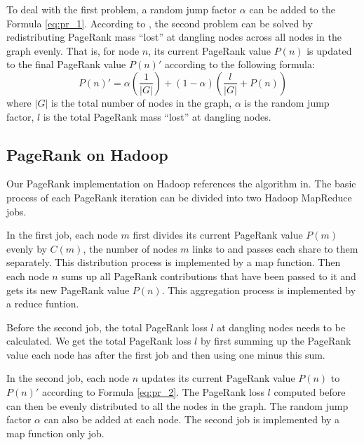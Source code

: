 \documentclass[12pt,conference,letterpaper]{IEEEtran}
\begin{document}
To deal with the first problem, a random jump factor $\alpha$ can be added to the Formula \ref{eq:pr_1}. According to \cite{monica2005}, the second problem can be solved by redistributing PageRank mass ``lost'' at dangling nodes across all nodes in the graph evenly. That is, for node $n$, its current PageRank value $P(n)$ is updated to the final PageRank value $P(n)'$ according to the following formula:
\begin{equation}
P(n)' = \alpha (\frac{1}{|G|}) + (1 - \alpha) (\frac{l}{|G|} + P(n)) \label{eq:pr_2}
\end{equation}
where $|G|$ is the total number of nodes in the graph, $\alpha$ is the random jump factor, $l$ is the total PageRank mass ``lost'' at dangling nodes.


\subsection{PageRank on Hadoop}
Our PageRank implementation on Hadoop references the algorithm in\cite{jimmy2010}. The basic process of each PageRank iteration can be divided into two Hadoop MapReduce jobs.

In the first job, each node $m$ first divides its current PageRank value $P(m)$ evenly by $C(m)$, the number of nodes $m$ links to and passes each share to them separately. This distribution process is implemented by a map function. Then each node $n$ sums up all PageRank contributions that have been passed to it and gets its new PageRank value $P(n)$. This aggregation process is implemented by a reduce funtion.

Before the second job, the total PageRank loss $l$ at dangling nodes needs to be calculated. We get the total PageRank loss $l$ by first summing up the PageRank value each node has after the first job and then using one minus this sum.

In the second job, each node $n$ updates its current PageRank value $P(n)$ to $P(n)'$ according to Formula \ref{eq:pr_2}. The PageRank loss $l$ computed before can then be evenly distributed to all the nodes in the graph. The random jump factor $\alpha$ can also be added at each node. The second job is implemented by a map function only job. 

\end{document}
